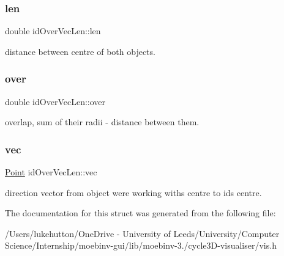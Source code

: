 \subsubsection{\texorpdfstring{len}{len}}
{\footnotesize\ttfamily double id\+Over\+Vec\+Len\+::len}

distance between centre of both objects. \mbox{\label{structid_over_vec_len_a9387d2c3130328e5e24988d759f5a46a}} 
\subsubsection{\texorpdfstring{over}{over}}
{\footnotesize\ttfamily double id\+Over\+Vec\+Len\+::over}

overlap, sum of their radii -\/ distance between them. \mbox{\label{structid_over_vec_len_a86fea6b0e81e2e4addb46265dd570985}} 
\subsubsection{\texorpdfstring{vec}{vec}}
{\footnotesize\ttfamily \mbox{\hyperlink{struct_point}{Point}} id\+Over\+Vec\+Len\+::vec}

direction vector from object we\textquotesingle{}re working with\textquotesingle{}s centre to id\textquotesingle{}s centre. 

The documentation for this struct was generated from the following file\+:\begin{DoxyCompactItemize}
\item 
/\+Users/lukehutton/\+One\+Drive -\/ University of Leeds/\+University/\+Computer Science/\+Internship/moebinv-\/gui/lib/moebinv-\/3./cycle3\+D-\/visualiser/vis.\+h\end{DoxyCompactItemize}
